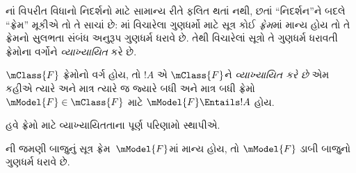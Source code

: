 નાં વિપરીત વિધાનો
નિદર્શનો માટે સામાન્ય રીતે ફલિત થતાં નથી, છતાં ``નિદર્શન''ને બદલે
``ફ્રેમ'' મૂકીએ તો તે સાચાં છે: માં
વિચારેલા ગુણધર્મો માટે સૂત્ર કોઈ \emph{ફ્રેમ}માં
માન્ય હોય તો તે ફ્રેમનો સુલભતા સંબંધ અનુરૂપ
ગુણધર્મ ધરાવે છે. તેથી વિચારેલાં સૂત્રો તે
ગુણધર્મ ધરાવતી ફ્રેમોના વર્ગોને \emph{વ્યાખ્યાયિત}
કરે છે.

\begin{defn}
  $\mClass{F}$ ફ્રેમોનો વર્ગ હોય, તો $!A$ એ
  $\mClass{F}$ને \emph{વ્યાખ્યાયિત કરે છે} એમ કહીએ
  ત્યારે અને માત્ર ત્યારે જ જ્યારે બધી અને માત્ર
  બધી ફ્રેમો~$\mModel{F} \in \mClass{F}$ માટે
  $\mModel{F} \Entails !A$ હોય.
\end{defn}

હવે ફ્રેમો માટે વ્યાખ્યાયિતતાના પૂર્ણ પરિણામો
સ્થાપીએ.

\begin{thm}
ની જમણી બાજુનું સૂત્ર
ફ્રેમ~$\mModel{F}$માં માન્ય હોય, તો $\mModel{F}$
ડાબી બાજુનો ગુણધર્મ ધરાવે છે.
\end{thm}

